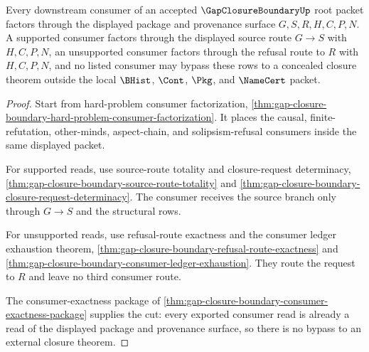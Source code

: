 \begin{theorem}
\label{thm:gap-closure-boundary-root-package-consumer-cut}
Every downstream consumer of an accepted $\GapClosureBoundaryUp$ root packet factors through the displayed package and provenance surface $G,S,R,H,C,P,N$. A supported consumer factors through the displayed source route $G \longrightarrow S$ with $H,C,P,N$, an unsupported consumer factors through the refusal route to $R$ with $H,C,P,N$, and no listed consumer may bypass these rows to a concealed closure theorem outside the local $\BHist$, $\Cont$, $\Pkg$, and $\NameCert$ packet.
\end{theorem}
\begin{proof}
Start from hard-problem consumer factorization, \autoref{thm:gap-closure-boundary-hard-problem-consumer-factorization}. It places the causal, finite-refutation, other-minds, aspect-chain, and solipsism-refusal consumers inside the same displayed packet.

For supported reads, use source-route totality and closure-request determinacy, \autoref{thm:gap-closure-boundary-source-route-totality} and \autoref{thm:gap-closure-boundary-closure-request-determinacy}. The consumer receives the source branch only through $G \longrightarrow S$ and the structural rows.

For unsupported reads, use refusal-route exactness and the consumer ledger exhaustion theorem, \autoref{thm:gap-closure-boundary-refusal-route-exactness} and \autoref{thm:gap-closure-boundary-consumer-ledger-exhaustion}. They route the request to $R$ and leave no third consumer route.

The consumer-exactness package of \autoref{thm:gap-closure-boundary-consumer-exactness-package} supplies the cut: every exported consumer read is already a read of the displayed package and provenance surface, so there is no bypass to an external closure theorem.
\end{proof}

